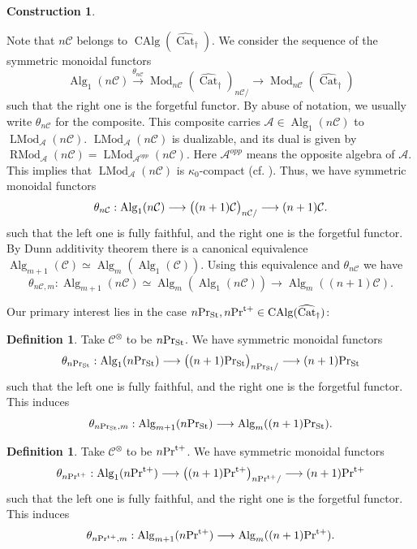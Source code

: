 \documentclass[leqno,12pt]{amsart}
\theoremstyle{plain}
\theoremstyle{definition}
\newtheorem{Definition}[Theorem]{Definition}
\newtheorem{Construction}[Theorem]{Construction}
\newcommand{\AAA}{\mathcal{A}}
\newcommand{\CCC}{\mathcal{C}}
\newcommand{\PR}{\textup{Pr}}
\newcommand{\PRTT}{\textup{Pr}^{\textup{t}+}}
\newcommand{\Mod}{\operatorname{Mod}}
\newcommand{\Alg}{\operatorname{Alg}}
\newcommand{\CAlg}{\operatorname{CAlg}}
\newcommand{\vCat}{\widehat{\operatorname{Cat}}_\dagger}
\newcommand{\PRST}{\PR_{\textup{St}}}
\newcommand{\LMod}{\operatorname{LMod}}
\newcommand{\RMod}{\operatorname{RMod}}
\begin{document}
\begin{Construction}
\begin{itemize}
\end{itemize}
Note that $n\CCC$ belongs to $\CAlg(\vCat)$.
We consider the sequence of the symmetric monoidal functors
\[
\Alg_1(n\CCC)\stackrel{\theta_{n\CCC}}{\longrightarrow}  \Mod_{n\CCC}(\vCat)_{n\CCC/}\longrightarrow \Mod_{n\CCC}(\vCat)
\]
such that the right one is the forgetful functor.
By abuse of notation, we usually write $\theta_{n\CCC}$ for the composite.
This composite carries $\AAA\in \Alg_1(n\CCC)$ to $\LMod_{\AAA}(n\CCC)$.
$\LMod_{\AAA}(n\CCC)$ is dualizable, and its dual is given by $\RMod_{\AAA}(n\CCC)=\LMod_{\AAA^{opp}}(n\CCC)$.
Here $\AAA^{opp}$ means the opposite algebra of $\AAA$.
This implies that $\LMod_{\AAA}(n\CCC)$ is $\kappa_0$-compact (cf. \cite[Proposition 5.1.10]{Ste}).
Thus, we have symmetric monoidal functors
\[
\theta_{n\CCC}:\Alg_1(n\CCC) \longrightarrow \big{(}(n+1)\CCC\big{)}_{n\CCC/}\longrightarrow (n+1)\CCC.
\]
such that the left one is fully faithful, and the right one is the forgetful functor.
By Dunn additivity theorem there is a canonical equivalence $\Alg_{m+1}(\CCC)\simeq \Alg_{m}(\Alg_1(\CCC))$.
Using this equivalence and $\theta_{n\CCC}$ we have
\[
\theta_{n\CCC,m}:\Alg_{m+1}(n\CCC)\simeq \Alg_m(\Alg_1(n\CCC)) \longrightarrow \Alg_{m}((n+1)\CCC).
\]
\end{Construction}

Our primary interest lies in the case $n\PRST, n\PRTT\in \CAlg(\vCat)$:





\begin{Definition}
Take $\CCC^\otimes$ to be $n\PRST$.
We have symmetric monoidal functors
\[
\theta_{n\PRST}:\Alg_1(n\PRST) \longrightarrow \big{(}(n+1)\PRST\big{)}_{n\PRST/}\longrightarrow (n+1)\PRST
\]
such that the left one is fully faithful, and the right one is the forgetful functor.
This induces
\[
\theta_{n\PRST,m}:\Alg_{m+1}(n\PRST) \longrightarrow \Alg_{m}((n+1)\PRST).
\]
\end{Definition}





\begin{Definition}
\label{thetadeftt}
Take $\CCC^\otimes$ to be $n\PRTT$.
We have symmetric monoidal functors
\[
\theta_{n\PRTT}:\Alg_1(n\PRTT) \longrightarrow \big{(}(n+1)\PRTT\big{)}_{n\PRTT/}\longrightarrow (n+1)\PRTT
\]
such that the left one is fully faithful, and the right one is the forgetful functor.
This induces
\[
\theta_{n\PRTT,m}:\Alg_{m+1}(n\PRTT) \longrightarrow \Alg_{m}((n+1)\PRTT).
\]
\end{Definition}
\end{document}
